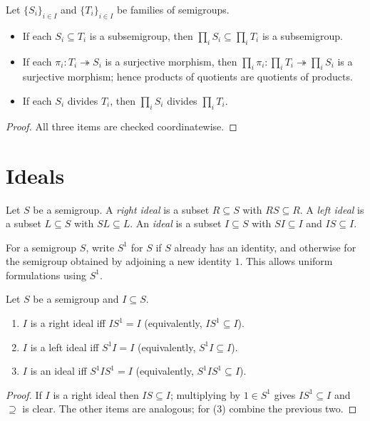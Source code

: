 \begin{lemma}
\label{lem:products-preserve-structure}
Let \(\{S_i\}_{i\in I}\) and \(\{T_i\}_{i\in I}\) be families of semigroups.
\begin{itemize}
  \item If each \(S_i\subseteq T_i\) is a subsemigroup, then \(\prod_i S_i\subseteq \prod_i T_i\) is a subsemigroup.
  \item If each \(\pi_i:T_i\twoheadrightarrow S_i\) is a surjective morphism, then \(\prod_i \pi_i:\prod_i T_i\twoheadrightarrow \prod_i S_i\) is a surjective morphism; hence products of quotients are quotients of products.
  \item If each \(S_i\) divides \(T_i\), then \(\prod_i S_i\) divides \(\prod_i T_i\).
\end{itemize}
\end{lemma}
\begin{proof}
All three items are checked coordinatewise.
\end{proof}

\section {Ideals}

\begin{definition}
\label{def:ideal}
Let \(S\) be a semigroup. A \emph{right ideal} is a subset \(R\subseteq S\) with \(RS\subseteq R\). A \emph{left ideal} is a subset \(L\subseteq S\) with \(SL\subseteq L\). An \emph{ideal} is a subset \(I\subseteq S\) with \(SI\subseteq I\) and \(IS\subseteq I\).
\end{definition}

\begin{remark}
\label{rem:S1}
For a semigroup \(S\), write \(S^1\) for \(S\) if \(S\) already has an identity, and otherwise for the semigroup obtained by adjoining a new identity \(1\). This allows uniform formulations using \(S^1\).
\end{remark}

\begin{lemma}
\label{lem:ideal-characterization-semigroup}
Let \(S\) be a semigroup and \(I\subseteq S\).
\begin{enumerate}
  \item \(I\) is a right ideal iff \(I S^1=I\) (equivalently, \(I S^1\subseteq I\)).
  \item \(I\) is a left ideal iff \(S^1 I=I\) (equivalently, \(S^1 I\subseteq I\)).
  \item \(I\) is an ideal iff \(S^1 I S^1=I\) (equivalently, \(S^1 I S^1\subseteq I\)).
\end{enumerate}
\end{lemma}
\begin{proof}
If \(I\) is a right ideal then \(IS\subseteq I\); multiplying by \(1\in S^1\) gives \(IS^1\subseteq I\) and \(\supseteq\) is clear. The other items are analogous; for (3) combine the previous two.
\end{proof}

